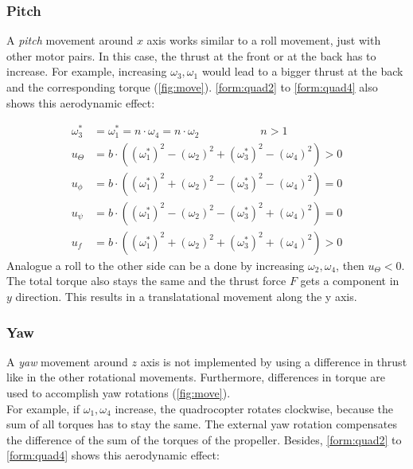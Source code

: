 \newpage

\subsubsection{Pitch}

A \emph{pitch} movement around $x$ axis works similar to a roll movement, just with other motor pairs. In this case, the thrust at the front or at the back has to increase. For example,  increasing $\omega_3, \omega_1$ would lead to a bigger thrust at the back and the corresponding torque (\cref{fig:move}). \cref{form:quad2} to \cref{form:quad4} also shows this aerodynamic effect:

\begin{align*}
	\omega_3^* &= \omega_1^* = n \cdot \omega_4 = n \cdot \omega_2 \qquad \qquad \quad \enspace  n > 1\\
	u_{\Theta} &= b \cdot ((\omega_1^*)^2 - (\omega_2)^2 + (\omega_3^*)^2 - (\omega_4)^2) > 0\\
	u_{\phi} &= b \cdot ((\omega_1^*)^2 + (\omega_2)^2 - (\omega_3^*)^2 - (\omega_4)^2) = 0 \\
	u_{\psi} &= b \cdot ((\omega_1^*)^2 - (\omega_2)^2 - (\omega_3^*)^2 + (\omega_4)^2)	= 0 \\
	u_f &= b \cdot ((\omega_1^*)^2 + (\omega_2)^2 + (\omega_3^*)^2 + (\omega_4)^2) > 0 
\end{align*}
\newline
Analogue a roll to the other side can be a done by increasing $\omega_2, \omega_4$, then $u_{\Theta} < 0$.  The total torque also stays the same and the thrust force $F$ gets a component in $y$ direction. This results in a translatational movement along the y axis.


\subsubsection{Yaw}
A \emph{yaw} movement around $z$ axis is not implemented by using a difference in thrust like in the other rotational movements. Furthermore, differences in torque are used to accomplish yaw rotations (\cref{fig:move}). \\
For example, if $\omega_1, \omega_4$  increase, the quadrocopter rotates clockwise, because the sum of all torques has to stay the same. The external yaw rotation compensates the difference of the sum of the torques of the propeller. Besides, \cref{form:quad2} to \cref{form:quad4} shows this aerodynamic effect:

